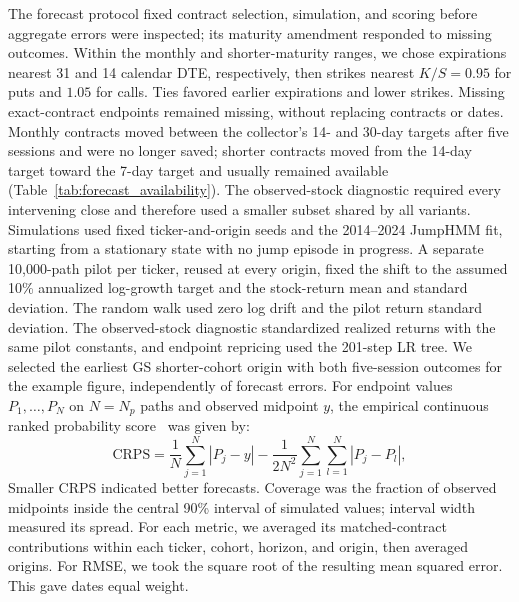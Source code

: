 The forecast protocol fixed contract selection, simulation, and scoring before aggregate errors were inspected; its maturity amendment responded to missing outcomes. Within the monthly and shorter-maturity ranges, we chose expirations nearest 31 and 14 calendar DTE, respectively, then strikes nearest $K/S=0.95$ for puts and $1.05$ for calls. Ties favored earlier expirations and lower strikes. Missing exact-contract endpoints remained missing, without replacing contracts or dates. Monthly contracts moved between the collector's 14- and 30-day targets after five sessions and were no longer saved; shorter contracts moved from the 14-day target toward the 7-day target and usually remained available (Table~\ref{tab:forecast_availability}). The observed-stock diagnostic required every intervening close and therefore used a smaller subset shared by all variants. Simulations used fixed ticker-and-origin seeds and the 2014--2024 JumpHMM fit, starting from a stationary state with no jump episode in progress. A separate 10{,}000-path pilot per ticker, reused at every origin, fixed the shift to the assumed 10\% annualized log-growth target and the stock-return mean and standard deviation. The random walk used zero log drift and the pilot return standard deviation. The observed-stock diagnostic standardized realized returns with the same pilot constants, and endpoint repricing used the 201-step LR tree. We selected the earliest GS shorter-cohort origin with both five-session outcomes for the example figure, independently of forecast errors. For endpoint values $P_1,\ldots,P_N$ on $N=N_p$ paths and observed midpoint $y$, the empirical continuous ranked probability score~\cite{gneiting2007} was given by:
\begin{equation}\label{eq:forecast_crps}
\mathrm{CRPS}=\frac{1}{N}\sum_{j=1}^{N}|P_j-y|
-\frac{1}{2N^2}\sum_{j=1}^{N}\sum_{l=1}^{N}|P_j-P_l|,
\end{equation}
Smaller CRPS indicated better forecasts. Coverage was the fraction of observed midpoints inside the central 90\% interval of simulated values; interval width measured its spread. For each metric, we averaged its matched-contract contributions within each ticker, cohort, horizon, and origin, then averaged origins. For RMSE, we took the square root of the resulting mean squared error. This gave dates equal weight.

\begin{table}[H]
\centering
\caption{Availability of exact-contract outcomes by cohort, ticker, and horizon. Horizons are in trading sessions. Selected counts all origin-selected contracts whose endpoint fell within August 4--September 4, 2026, including endpoints on missing capture dates. Matched counts the selected contracts with an exact-symbol quote at the endpoint. Full stock path counts selected contracts with all intervening stock observations, whether or not the endpoint option quote was available.}\label{tab:forecast_availability}
\resizebox{\textwidth}{!}{}
\end{table}

